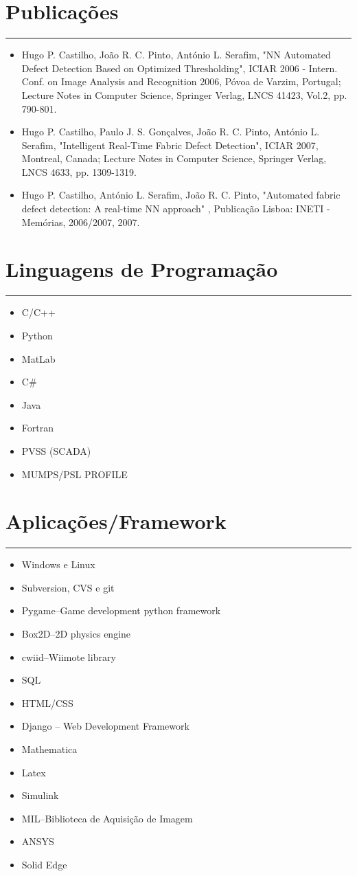 \documentclass[a4paper,portuguese]{article}
\newcommand{\topic}[1]{
\section*{#1} \vspace{-6mm}
\rule{\columnwidth}{.25mm}
}
\begin{document}
\topic{Publicações}
\begin{itemize}
    \item[] Hugo P. Castilho, João R. C. Pinto, António L. Serafim, "NN
Automated Defect Detection Based on Optimized Thresholding", ICIAR 2006 -
Intern. Conf. on Image Analysis and Recognition 2006, Póvoa
de Varzim, Portugal; Lecture Notes in Computer Science, Springer Verlag,
LNCS 41423, Vol.2, pp. 790-801.
    \item[] Hugo P. Castilho, Paulo J. S. Gonçalves, João R. C. Pinto, António
L. Serafim, "Intelligent Real-Time Fabric Defect Detection", ICIAR
2007, Montreal, Canada; Lecture Notes in Computer Science, Springer Verlag,
LNCS 4633, pp. 1309-1319.
    \item[] Hugo P. Castilho, António L. Serafim, João R. C. Pinto, "Automated
fabric defect detection: A real-time NN approach" , Publicação Lisboa: INETI - 
Memórias, 2006/2007, 2007.
\end{itemize}

\topic{Linguagens de Programação}
\begin{itemize}
\setlength{\itemsep}{-1mm}
    \item C/C++
    \item Python
    \item MatLab
    \item C\#
    \item Java
    \item Fortran
    \item PVSS (SCADA)
    \item MUMPS/PSL PROFILE
\end{itemize}

\topic{Aplicações/Framework}
\begin{itemize}
\setlength{\itemsep}{-1mm}
    \item Windows e Linux
    \item Subversion, CVS e git
    \item Pygame--Game development python framework
    \item Box2D--2D physics engine
    \item cwiid--Wiimote library
    \item SQL
    \item HTML/CSS
    \item Django -- Web Development Framework
    \item Mathematica
    \item Latex
    \item Simulink
    \item MIL--Biblioteca de Aquisição de Imagem
    \item ANSYS
    \item Solid Edge
\end{itemize}
\end{document}
